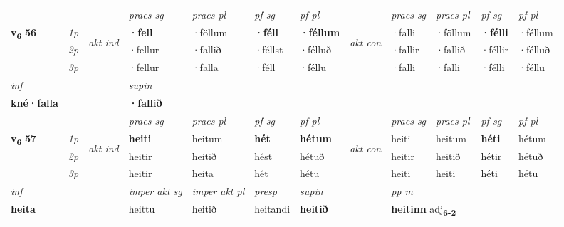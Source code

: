 \begin{longtable}[l]{X>{\footnotesize\itshape}llXXXXlXXXX}
 & &   & \textit{praes sg}  & \textit{praes pl}    & \textit{ pf sg} & \textit{pf pl} & & \textit{praes sg}  & \textit{praes pl}    & \textit{pf sg} & \textit{pf pl }  \\ \cmidrule{4-7} \cmidrule{9-12}
 \multirow{2}{*}{{{\textbf{v{\textsubscript{6}}} \Large{\textbf{56}}}}}  & 1p & \multirow{3}{*}{\begin{turn}{90}\textit{akt ind}\end{turn}} & \textbf{·fell} & ·föllum & \textbf{·féll} & \textbf{·féllum} & \multirow{3}{*}{\begin{turn}{90}\textit{akt con}\end{turn}} &·falli & ·föllum & \textbf{·félli} & ·féllum\\*
 & 2p &  &  ·fellur  & ·fallið & ·féllst & ·félluð & & ·fallir & ·fallið & ·féllir & ·félluð \\*
 & 3p &  & ·fellur & ·falla & ·féll & ·féllu & & ·falli & ·falli& ·félli & ·féllu \\*
\cmidrule{4-7} \cmidrule{9-12}

   {\textit{inf}} & &      & \textit{supin}   \\*
  {\textbf{kné\allowbreak ·falla}} & &      &  \textbf{·fallið}   \\*

\midrule

 & &   & \textit{praes sg}  & \textit{praes pl}    & \textit{ pf sg} & \textit{pf pl} & & \textit{praes sg}  & \textit{praes pl}    & \textit{pf sg} & \textit{pf pl }  \\ \cmidrule{4-7} \cmidrule{9-12}
 \multirow{2}{*}{{{\textbf{v{\textsubscript{6}}} \Large{\textbf{57}}}}}  & 1p & \multirow{3}{*}{\begin{turn}{90}\textit{akt ind}\end{turn}} & \textbf{heiti} & heitum & \textbf{hét} & \textbf{hétum} & \multirow{3}{*}{\begin{turn}{90}\textit{akt con}\end{turn}} &heiti & heitum & \textbf{héti} & hétum\\*
 & 2p &  &  heitir  & heitið & hést & hétuð & & heitir & heitið & hétir & hétuð \\*
 & 3p &  & heitir & heita & hét & hétu & & heiti & heiti& héti & hétu \\*
\cmidrule{4-7} \cmidrule{9-12}

   {\textit{inf}} & &  & \textit{imper akt sg} & \textit{imper akt pl}   & \textit{presp} & \textit{supin}  && \textit{pp m} \\*
  {\textbf{heita}} & && heittu  & heitið   & heitandi &  \textbf{heitið}  && \multicolumn{2}{l}{\textbf{heitinn} adj\textbf{\textsubscript{6-2}}} \\*


\end{longtable}

